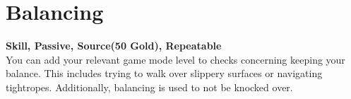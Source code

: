 \section{Balancing}\label{sec:balancing}
\textbf{Skill, Passive, Source(50 Gold), Repeatable}\\
You can add your relevant game mode level to checks concerning keeping your balance.
This includes trying to walk over slippery surfaces or navigating tightropes.
Additionally, balancing is used to not be knocked over.